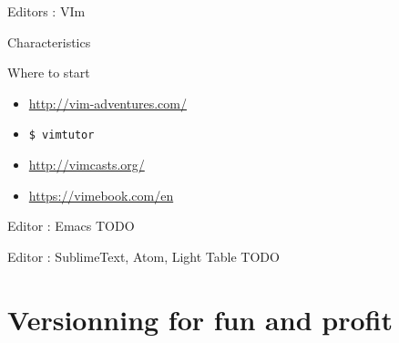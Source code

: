 \documentclass[10pt]{beamer}
\begin{document}
\begin{frame}[t]{Editors : VIm}
{\begin{block}{Characteristics}
\begin{itemize}
			\end{itemize}
		\end{block}
		\begin{block}{Where to start}
			\begin{itemize}
				\item \url{http://vim-adventures.com/}
				\item \texttt{\$ vimtutor}
				\item \url{http://vimcasts.org/}
				\item \url{https://vimebook.com/en}
			\end{itemize}
		\end{block}
	}
\end{frame}

\begin{frame}[t]{Editor : Emacs} %
 	TODO
\end{frame}

\begin{frame}[t]{Editor : SublimeText, Atom, Light Table} %
	TODO
\end{frame}

\section{Versionning for fun and profit} %
\end{document}
